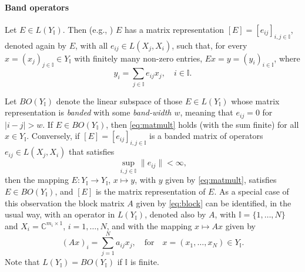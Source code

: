 \documentclass[preprint,1p,11pt]{elsarticle}
\newcommand\C{{\mathbb C}}
\newcommand\I{{\mathbb I}}
\numberwithin{equation}{section}   %
\numberwithin{figure}{section}  %
\begin{document}
\paragraph{Band operators}  Let $E\in L(Y_\I)$. Then (e.g., \cite{LiBook}) $E$ has a matrix representation $[E]=[e_{ij}]_{i,j\in \I}$, denoted again by $E$, with all $e_{ij}\in L(X_j,X_i)$, such that, for every $x=(x_j)_{j\in \I}\in Y_\I$ with finitely many non-zero entries, $Ex = y=(y_i)_{i\in \I}$, where 
\begin{equation} \label{eq:matmult}
y_i = \sum_{j\in \I} e_{ij}x_j, \quad i\in \I.
\end{equation}

Let $BO(Y_\I)$ denote the linear subspace of those  $E\in L(Y_\I)$ whose matrix representation is {\em banded} with some {\em band-width $w$}, meaning that $e_{ij}=0$ for $|i-j|>w$. If $E\in BO(Y_\I)$, then \eqref{eq:matmult} holds (with the sum finite) for all $x\in Y_\I$. Conversely, if $[E]=[e_{ij}]_{i,j\in \I}$ is a banded matrix of operators  $e_{ij}\in L(X_j,X_i)$ that satisfies 
\begin{equation} \label{eq:eijbound}
\sup_{i,j\in \I}\|e_{ij}\| < \infty,
\end{equation}
then the mapping $E:Y_\I\to Y_\I$, $x\mapsto y$, with $y$ given by \eqref{eq:matmult}, satisfies $E\in BO(Y_\I)$, and $[E]$ is the matrix representation of  $E$. As a special case of this observation the block matrix $A$ given by \eqref{eq:block} can be identified, in the usual way, with an operator in $L(Y_\I)$, denoted also by $A$, with   $\I=\{1,\ldots,N\}$ and $X_i = \C^{m_i\times 1}$, $i=1,\ldots,N$, and with the mapping $x\mapsto Ax$ given by
$$
(Ax)_i = \sum_{j=1}^N a_{ij} x_j, \quad \mbox{for} \quad x=(x_1,\ldots,x_N) \in Y_\I.
$$
Note that  $L(Y_\I)=BO(Y_\I)$ if $\I$ is finite.

\end{document}
